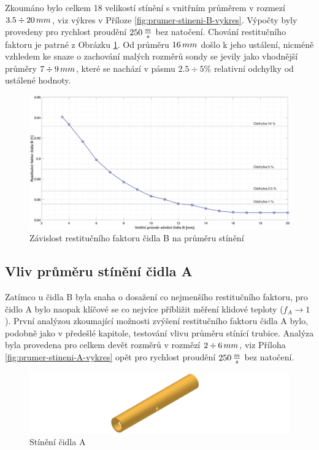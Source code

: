         Zkoumáno bylo celkem 18 velikostí stínění s vnitřním průměrem v rozmezí \linebreak$3.5 \div 20\, mm$, viz výkres v Příloze \ref{fig:prumer-stineni-B-vykres}. Výpočty byly provedeny pro rychlost proudění $250 \, \frac{m}{s}$ bez natočení. Chování restitučního faktoru je patrné z Obrázku \ref{fig:prumer-stineni-B}. Od průměru $16 \, mm$ došlo k jeho ustálení, nicméně vzhledem ke snaze o zachování malých rozměrů sondy se jevily jako vhodnější průměry $7 \div 9 \, mm$, které se nachází v pásmu $2.5 \div 5 \%$ relativní odchylky od ustálené hodnoty.
        
        \begin{figure}[ht!]
            \centering
            \includegraphics*[width=\textwidth]{400_SIMULACE_KONSTRUKCNICH_UPRAV/Grafy/04_prumer_stineni_B}
            \caption{Závislost restitučního faktoru čidla B na průměru stínění}
            \label{fig:prumer-stineni-B}
        \end{figure}
    
    \newpage
    \subsection{Vliv průměru stínění čidla A} \label{sec:stineni-A}
        Zatímco u čidla B byla snaha o dosažení co nejmenšího restitučního faktoru, pro čidlo A bylo naopak klíčové se co nejvíce příbližit měření klidové teploty ($f_A \rightarrow 1$). První analýzou zkoumající možnosti zvýšení restitučního faktoru čidla A bylo, podobně jako v předešlé kapitole, testování vlivu průměru stínící trubice. Analýza byla provedena pro celkem devět rozměrů v rozmězí $2 \div 6 \, mm$, viz Příloha \ref{fig:prumer-stineni-A-vykres} opět pro rychlost proudění $250 \, \frac{m}{s}$ bez natočení.
        
        \begin{figure}[ht!]
            \centering
            \includegraphics[width=\textwidth]{400_SIMULACE_KONSTRUKCNICH_UPRAV/Vykresy_rendery/Stineni_A.png}
            \caption{Stínění čidla A}
            \label{fig:stineni-A}
        \end{figure}

